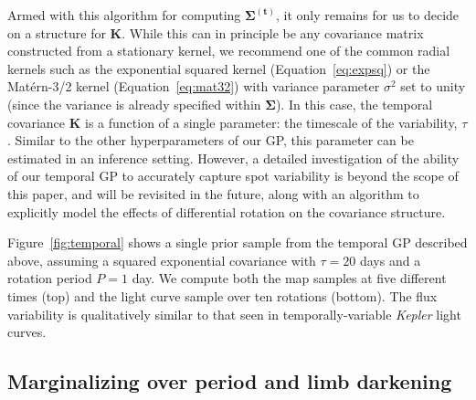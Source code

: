 \documentclass[modern]{aastex62}
\begin{document}
Armed with this algorithm for computing $\pmb{\Sigma}^\mathbf{(t)}$, it only
remains for us to decide on a structure for $\mathbf{K}$. While this can
in principle be any covariance matrix constructed from a stationary kernel,
we recommend one of the common radial kernels such as the exponential
squared kernel (Equation~\ref{eq:expsq}) or the Mat\'ern-3/2 kernel
(Equation~\ref{eq:mat32}) with variance parameter $\sigma^2$ set to
unity (since the variance is already specified within $\pmb{\Sigma}$). In this
case, the temporal covariance $\mathbf{K}$ is a function of a single
parameter: the timescale of the variability, $\tau$. Similar to the other
hyperparameters of our GP, this parameter can be estimated in an inference
setting. However, a detailed investigation of the ability of our temporal
GP to accurately capture spot variability is beyond the scope of this paper,
and will be revisited in the future, along with an algorithm to explicitly
model the effects of differential rotation on the covariance structure.

Figure~\ref{fig:temporal} shows a single prior sample from the temporal
GP described above, assuming a squared exponential covariance with $\tau = 20$ days
and a rotation period $P = 1$ day. We compute both the map samples at five
different times (top) and the light curve sample over ten rotations (bottom).
The flux variability is qualitatively similar to that seen in
temporally-variable \emph{Kepler} light curves.

\subsection{Marginalizing over period and limb darkening}
\label{sec:other-marg}
\end{document}

